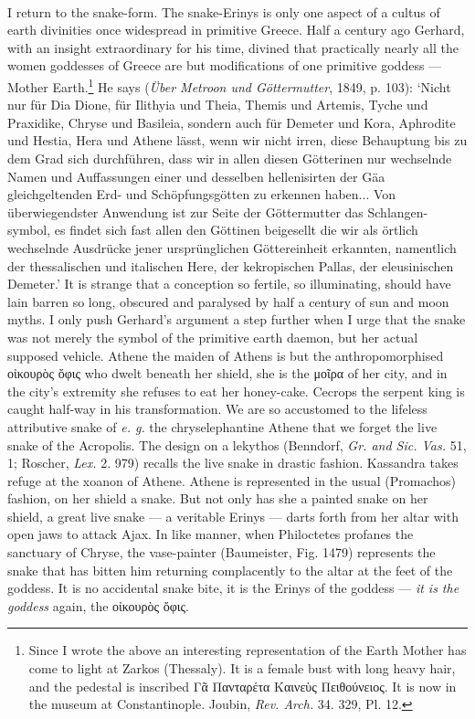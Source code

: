 \documentclass[a4paper, 11pt, oneside, polutonikogreek, english]{article}
\begin{document}
\paragraph{}
I return to the snake-form. The snake-Erinys is only one aspect of a cultus of earth divinities once widespread in primitive Greece. Half a century ago Gerhard, with an insight extraordinary for his time, divined that practically nearly all the women goddesses of Greece are but modifications of one primitive goddess --- Mother Earth.\footnote{Since I wrote the above an interesting representation of the Earth Mother has come to  light at Zarkos (Thessaly). It is a female bust with long heavy hair, and the pedestal is inscribed Γᾶ Πανταρέτα Καινεὺς Πειθούνειος. It is now in the museum at Constantinople. Joubin,
\emph{Rev. Arch.} 34. 329, Pl. 12.} He says (\emph{Über Metroon und Göttermutter}, 1849, p. 103): `Nicht nur für Dia Dione, für Ilithyia und Theia, Themis und Artemis, Tyche und Praxidike, Chryse und Basileia, sondern auch für Demeter und Kora, Aphrodite und Hestia, Hera und Athene lässt, wenn wir nicht irren, diese Behauptung bis zu dem Grad sich durchführen, dass wir in allen diesen Götterinen nur wechselnde Namen und Auffassungen einer und desselben hellenisirten der Gäa gleichgeltenden Erd- und Schöpfungsgötten zu erkennen haben... Von überwiegendster Anwendung ist zur Seite der Göttermutter das Schlangen-symbol, es findet sich fast allen den Göttinen beigesellt die wir als örtlich wechselnde Ausdrücke jener ursprünglichen Göttereinheit erkannten, namentlich der thessalischen und italischen Here, der kekropischen Pallas, der eleusinischen Demeter.' It is strange that a conception so fertile, so illuminating, should have lain barren so long, obscured and paralysed by half a century of sun and moon myths. I only push Gerhard's argument a step further when I urge that the snake was not merely the symbol of the primitive earth daemon, but her actual supposed vehicle. Athene the maiden of Athens is but the anthropomorphised οἰκουρὸς ὄφις who dwelt beneath her shield, she is the μοῖρα of her city, and in the city's extremity she refuses to eat her honey-cake. Cecrops the serpent king is caught half-way in his transformation. We are so accustomed to the lifeless attributive snake of \emph{e. g.} the chryselephantine Athene that we forget the live snake of the Acropolis. The design on a lekythos (Benndorf, \emph{Gr. and Sic. Vas.} 51, 1; Roscher, \emph{Lex.} 2. 979) recalls the live snake in drastic fashion. Kassandra takes refuge at the xoanon of Athene. Athene is represented in the usual (Promachos) fashion, on her shield a snake. But not only has she a painted snake on her shield, a great live snake --- a veritable Erinys --- darts forth from her altar with open jaws to attack Ajax. In like manner, when Philoctetes profanes the sanctuary of Chryse, the vase-painter (Baumeister, Fig. 1479) represents the snake that has bitten him returning complacently to the altar at the feet of the goddess. It is no accidental snake bite, it is the Erinys of the goddess --- \emph{it is the goddess} again, the οἰκουρὸς ὄφις.
\end{document}
